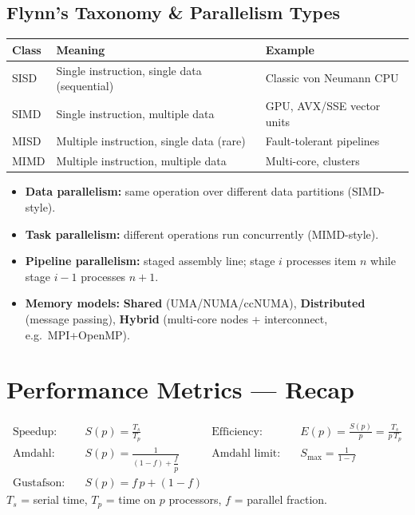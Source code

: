 \documentclass[11pt,a4paper]{article}
\begin{document}
\subsection{Flynn's Taxonomy \& Parallelism Types}
\begin{longtable}{@{}p{1.7cm}p{6.0cm}p{5.5cm}@{}}
\toprule
\rowcolor{primary!15}
\textbf{Class} & \textbf{Meaning} & \textbf{Example} \\
\midrule
\endhead
SISD & Single instruction, single data (sequential) & Classic von Neumann CPU \\
SIMD & Single instruction, multiple data & GPU, AVX/SSE vector units \\
MISD & Multiple instruction, single data (rare) & Fault-tolerant pipelines \\
MIMD & Multiple instruction, multiple data & Multi-core, clusters \\
\bottomrule
\end{longtable}

\begin{itemize}[leftmargin=*, itemsep=2pt]
  \item \textbf{Data parallelism:} same operation over different data partitions (SIMD-style).
  \item \textbf{Task parallelism:} different operations run concurrently (MIMD-style).
  \item \textbf{Pipeline parallelism:} staged assembly line; stage $i$ processes item $n$ while stage $i{-}1$ processes $n{+}1$.
  \item \textbf{Memory models:} \textbf{Shared} (UMA/NUMA/ccNUMA), \textbf{Distributed} (message passing), \textbf{Hybrid} (multi-core nodes + interconnect, e.g.\ MPI+OpenMP).
\end{itemize}

\section{Performance Metrics --- Recap}

\begin{formulabox}
\begin{align*}
\text{Speedup:}\quad & S(p) = \frac{T_s}{T_p} & \text{Efficiency:}\quad & E(p) = \frac{S(p)}{p} = \frac{T_s}{p\,T_p}\\[6pt]
\text{Amdahl:}\quad & S(p) = \frac{1}{(1-f) + \dfrac{f}{p}} & \text{Amdahl limit:}\quad & S_{\max} = \frac{1}{1-f}\\[6pt]
\text{Gustafson:}\quad & S(p) = f\,p + (1-f) & &
\end{align*}
$T_s$ = serial time, $T_p$ = time on $p$ processors, $f$ = parallel fraction.
\end{formulabox}
\end{document}
